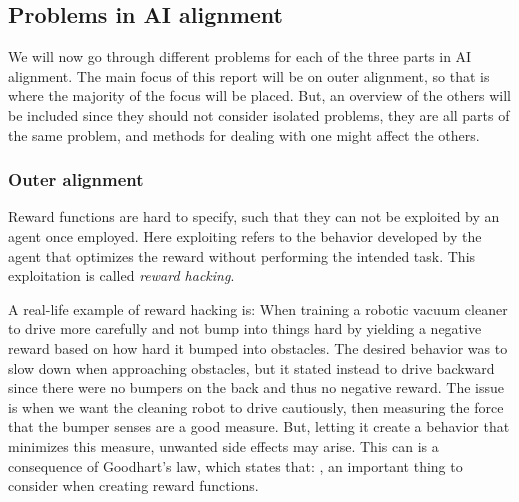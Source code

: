 \documentclass[12pt,A4]{report}
\theoremstyle{definition}
\begin{document}

\subsection{Problems in AI alignment}
We will now go through different problems for each of the three parts in AI alignment. The main focus of this report will be on outer alignment, so that is where the majority of the focus will be placed. But, an overview of the others will be included since they should not consider isolated problems, they are all parts of the same problem, and methods for dealing with one might affect the others.

\subsubsection{Outer alignment}
Reward functions are hard to specify, such that they can not be exploited by an agent once employed\autocite{Turner et al. (2020)}. Here exploiting refers to the behavior developed by the agent that optimizes the reward without performing the intended task. This exploitation is called \textit{reward hacking}. 

A real-life example of reward hacking is: When training a robotic vacuum cleaner to drive more carefully and not bump into things hard by yielding a negative reward based on how hard it bumped into obstacles. The desired behavior was to slow down when approaching obstacles, but it stated instead to drive backward since there were no bumpers on the back and thus no negative reward\autocite{Custard Smingleigh}. The issue is when we want the cleaning robot to drive cautiously, then measuring the force that the bumper senses are a good measure. But, letting it create a behavior that minimizes this measure, unwanted side effects may arise. This can is a consequence of Goodhart's law, which states that: \autocite{Goodhars-wiki}, an important thing to consider when creating reward functions. 
\end{document}
